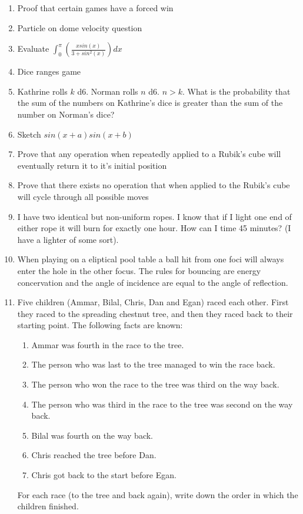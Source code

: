 \documentclass[a4paper]{article}
\begin{document}
\begin{enumerate}
\item
Proof that certain games have a forced win

\item
Particle on dome velocity question

\item
Evaluate
$\int_{0}^{\pi}(\frac{xsin(x)}{3 + sin^2(x)})dx$

\item
Dice ranges game

\item
Kathrine rolls $k$ d6. Norman rolls $n$ d6. $n > k$. What is the probability that the sum of the numbers on Kathrine's dice is greater than the sum of the number on Norman's dice?

\item
Sketch $sin(x+a)sin(x+b)$

\item
Prove that any operation when repeatedly applied to a Rubik's cube will eventually return it to it's initial position

\item
Prove that there exists no operation that when applied to the Rubik's cube will cycle through all possible moves

\item
I have two identical but non-uniform ropes. I know that if I light one end of either rope it will burn for exactly one hour. How can I time 45 minutes? (I have a lighter of some sort).

\item
When playing on a eliptical pool table a ball hit from one foci will always enter the hole in the other focus. The rules for bouncing are energy concervation and the angle of incidence are equal to the angle of reflection.

\item
Five children (Ammar, Bilal, Chris, Dan and Egan) raced each other.  First they raced to the spreading chestnut tree, and then they raced back to their starting point. The following facts are known:
\begin{enumerate}
	\item Ammar was fourth in the race to the tree.
	\item The person who was last to the tree managed to win the race back.
	\item The person who won the race to the tree was third on the way back.
	\item The person who was third in the race to the tree was second on the way back.
	\item Bilal was fourth on the way back.
	\item Chris reached the tree before Dan.
	\item Chris got back to the start before Egan.
\end{enumerate}
For  each  race  (to  the  tree  and  back  again),  write  down  the  order  in  which  the  children finished.

\end{enumerate}
\end{document}
